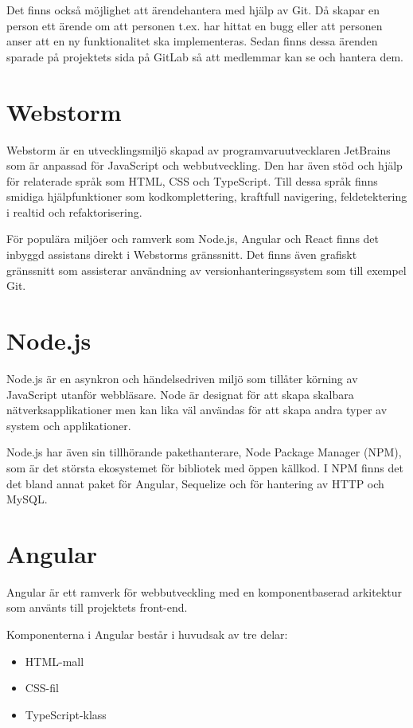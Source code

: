 Det finns också möjlighet att ärendehantera med hjälp av Git.
Då skapar en person ett ärende om att personen t.ex. har hittat en bugg eller att personen anser att en ny funktionalitet ska implementeras.
Sedan finns dessa ärenden sparade på projektets sida på GitLab så att medlemmar kan se och hantera dem. \cite{gitlab}

\section{Webstorm}
Webstorm är en utvecklingsmiljö skapad av programvaruutvecklaren JetBrains som är anpassad för JavaScript och webbutveckling. Den har även stöd och hjälp för relaterade språk som HTML, CSS och TypeScript. Till dessa språk finns smidiga hjälpfunktioner som kodkomplettering, kraftfull navigering, feldetektering i realtid och refaktorisering.

För populära miljöer och ramverk som Node.js, Angular och React finns det inbyggd assistans direkt i Webstorms gränssnitt. Det finns även grafiskt gränssnitt som assisterar användning av versionhanteringssystem som till exempel Git.\cite{webstorm}
\section{Node.js}
Node.js är en asynkron och händelsedriven miljö som tillåter körning av JavaScript utanför webbläsare. Node är designat för att skapa skalbara nätverksapplikationer men kan lika väl användas för att skapa andra typer av system och applikationer. \cite{nodejs}

Node.js har även sin tillhörande pakethanterare, Node Package Manager (NPM), som är det största ekosystemet för bibliotek med öppen källkod. \cite{npm}
I NPM finns det det bland annat paket för Angular, Sequelize och för hantering av HTTP och MySQL.

\section{Angular}
Angular är ett ramverk för webbutveckling med en komponentbaserad arkitektur som använts till projektets front-end.

Komponenterna i Angular består i huvudsak av tre delar:

\begin{itemize}
\item HTML-mall
\item CSS-fil
\item TypeScript-klass
\end{itemize}

